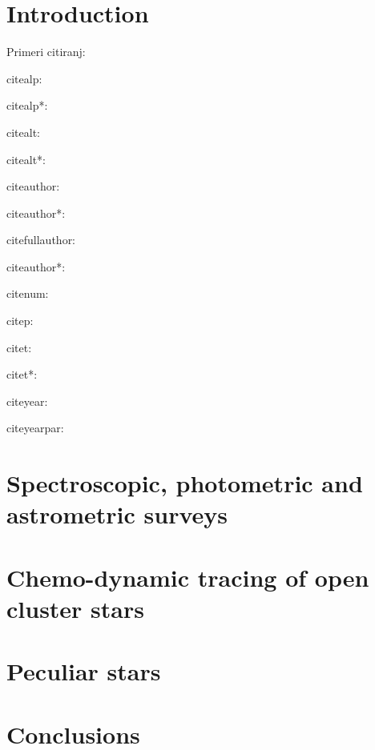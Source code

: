 \pagestyle{fancy}
\fancyhead[CE,RE]{}
\fancyhead[LO,CO]{}
\fancyhead[LE]{\textbf{\nouppercase{\leftmark}}}
\fancyhead[RO]{\textbf{\nouppercase{\rightmark}}}


\chapter{Introduction}
Primeri citiranj:

citealp: \citealp{APS}

citealp*: \citealp*{APS}

citealt: \citealt{APS}

citealt*: \citealt*{APS}

citeauthor: \citeauthor{APS}

citeauthor*: \citeauthor*{APS}

citefullauthor: 

citeauthor*: \citeauthor*{APS}

citenum: 

citep: \citep{APS}

citet: \citet{APS}

citet*: \citet*{APS}

citeyear: \citeyear{APS}

citeyearpar: \citeyearpar{APS}



\chapter{Spectroscopic, photometric and astrometric surveys}


\chapter{Chemo-dynamic tracing of open cluster stars}


\chapter{Peculiar stars}


\chapter{Conclusions}




